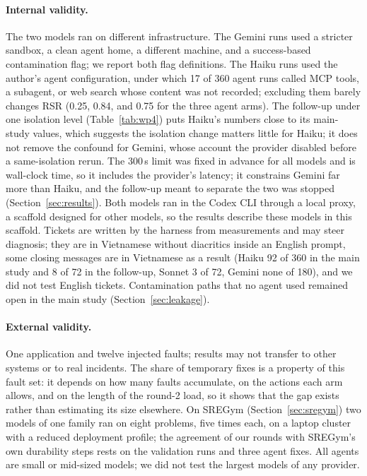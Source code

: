 \paragraph{Internal validity.} The two models ran on different infrastructure. The Gemini runs used a stricter sandbox, a
clean agent home, a different machine, and a success-based contamination flag; we report both flag definitions. The
Haiku runs used the author's agent configuration, under which 17 of 360 agent runs called MCP tools, a subagent, or web
search whose content was not recorded; excluding them barely changes RSR (0.25, 0.84, and 0.75 for the three agent arms).
The follow-up under one isolation level (Table~\ref{tab:wp4}) puts Haiku's numbers close to its main-study values, which
suggests the isolation change matters little for Haiku; it does not remove the confound for Gemini, whose account the
provider disabled before a same-isolation rerun. The 300\,s limit was fixed in advance for all models and is wall-clock
time, so it includes the provider's latency; it constrains Gemini far more than Haiku, and the follow-up meant to separate
the two was stopped (Section~\ref{sec:results}). Both models ran in the Codex CLI through a local proxy, a scaffold
designed for other models, so the results describe these models in this scaffold. Tickets are written by the harness from
measurements and may steer diagnosis; they are in Vietnamese without diacritics inside an English prompt, some closing
messages are in Vietnamese as a result (Haiku 92 of 360 in the main study and 8 of 72 in the follow-up, Sonnet 3 of 72,
Gemini none of 180), and we did not test English tickets. Contamination paths that no agent used remained open in the main
study (Section~\ref{sec:leakage}).

\paragraph{External validity.} One application and twelve injected faults; results may not transfer to other systems or to
real incidents. The share of temporary fixes is a property of this fault set: it depends on how many faults accumulate, on
the actions each arm allows, and on the length of the round-2 load, so it shows that the gap exists rather than estimating
its size elsewhere. On SREGym (Section~\ref{sec:sregym}) two models of one family ran on eight problems, five times each,
on a laptop cluster with a reduced deployment profile; the agreement of our rounds with SREGym's own durability steps rests
on the validation runs and three agent fixes. All agents are small or mid-sized models; we did not test the largest models
of any provider.

